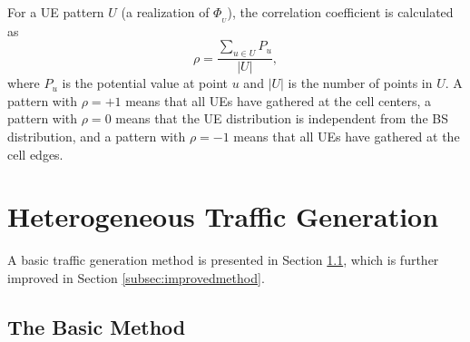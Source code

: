 \documentclass[journal]{IEEEtran}
\begin{document}
For a UE pattern $U$ (a realization of $\Phi_{_{U}}$), the correlation coefficient is calculated as
\begin{equation}
\label{eq:rho}
\rho = \frac{\sum_{u \in U} P_{u}}{\left | U \right |},
\end{equation}
where $P_{u}$ is the potential value at point $u$ and $\left | U \right |$ is the number of points in $U$. A pattern with $\rho = +1$ means that all UEs have gathered at the cell centers, a pattern with $\rho = 0$ means that the UE distribution is independent from the BS distribution, and a pattern with $\rho = -1$ means that all UEs have gathered at the cell edges.






























\section{Heterogeneous Traffic Generation}
\label{sec:generation}

A basic traffic generation method is presented in Section \ref{subsec:basicmethod}, which is further improved in Section \ref{subsec:improvedmethod}.









\subsection{The Basic Method}
\label{subsec:basicmethod}
\end{document}
